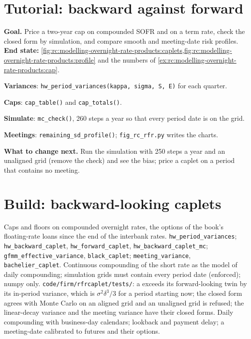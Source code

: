 \section{Tutorial: backward against forward}\label{tut:rc:modelling-overnight-rate-products:tutorial}

\begin{tutorial}
\textbf{Goal.} Price a two-year cap on compounded SOFR and on a term rate, check the
closed form by simulation, and compare smooth and meeting-date risk profiles.
\textbf{End state:}
\cref{fig:rc:modelling-overnight-rate-products:caplets,fig:rc:modelling-overnight-rate-products:profile}
and the numbers of \cref{ex:rc:modelling-overnight-rate-products:cap}.
\begin{tutsteps}
\item \textbf{Variances}: \texttt{hw\_period\_variances(kappa, sigma, S, E)} for each
quarter.
\item \textbf{Caps}: \texttt{cap\_table()} and \texttt{cap\_totals()}.
\item \textbf{Simulate}: \texttt{mc\_check()}, 260 steps a year so that every period
date is on the grid.
\item \textbf{Meetings}: \texttt{remaining\_sd\_profile()}; \texttt{fig\_rc\_rfr.py}
writes the charts.
\end{tutsteps}
\textbf{What to change next.} Run the simulation with 250 steps a year and an
unaligned grid (remove the check) and see the bias; price a caplet on a period
that contains no meeting.
\end{tutorial}

\section{Build: backward-looking caplets}\label{bld:rc:modelling-overnight-rate-products:rfrcaplet}

\begin{build}
 Caps and floors on compounded overnight rates, the options of the
book's floating-rate loans since the end of the interbank rates.
 \texttt{hw\_period\_variances}; \texttt{hw\_backward\_caplet},
\texttt{hw\_forward\_caplet}, \texttt{hw\_backward\_caplet\_mc};
\texttt{gfmm\_effective\_variance}, \texttt{black\_caplet};
\texttt{meeting\_variance}, \texttt{bachelier\_caplet}.
 Continuous compounding of the short rate as the model of daily
compounding; simulation grids must contain every period date (enforced); numpy only.
 \texttt{code/firm/rfrcaplet/tests/}: a  exceeds its forward-looking twin by its in-period variance, which is
$\sigma^2\delta^3/3$ for a period starting now; the closed form agrees with Monte Carlo
on an aligned grid and an unaligned grid is refused; the linear-decay variance and the
meeting variance have their closed forms.
 Daily compounding with business-day calendars; lookback and payment
delay; a meeting-date  calibrated to futures and their options.
\end{build}

